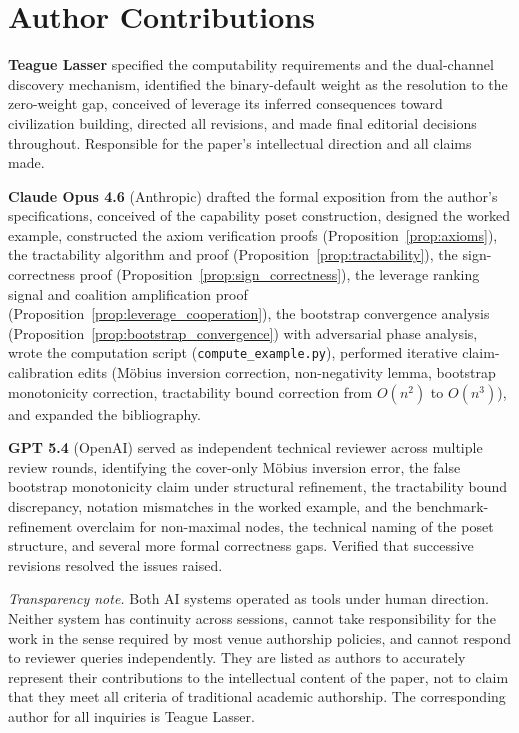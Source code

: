 \section*{Author Contributions}

\textbf{Teague Lasser} specified the computability requirements and the
dual-channel discovery mechanism, identified the binary-default weight as the
resolution to the zero-weight gap, conceived of leverage its inferred
consequences toward civilization building, directed all revisions, and made
final editorial decisions throughout. Responsible for the paper's intellectual
direction and all claims made.

\textbf{Claude Opus 4.6} (Anthropic) drafted the formal exposition from the
author's specifications, conceived of the capability poset construction,
designed the worked example, constructed the axiom verification proofs
(Proposition~\ref{prop:axioms}), the tractability algorithm and proof
(Proposition~\ref{prop:tractability}), the sign-correctness proof
(Proposition~\ref{prop:sign_correctness}), the leverage ranking signal and
coalition amplification proof
(Proposition~\ref{prop:leverage_cooperation}),
the bootstrap convergence analysis
(Proposition~\ref{prop:bootstrap_convergence}) with adversarial phase
analysis, wrote the computation script (\texttt{compute\_example.py}),
performed iterative claim-calibration edits (M\"{o}bius inversion correction,
non-negativity lemma, bootstrap monotonicity correction, tractability bound
correction from $O(n^2)$ to $O(n^3)$), and expanded the bibliography.

\textbf{GPT 5.4} (OpenAI) served as independent technical reviewer across
multiple review rounds, identifying the cover-only M\"{o}bius inversion error,
the false bootstrap monotonicity claim under structural refinement, the
tractability bound discrepancy, notation mismatches in the worked example, and
the benchmark-refinement overclaim for non-maximal nodes, the technical naming
of the poset structure, and several more formal correctness gaps. Verified that
successive revisions resolved the issues raised.

\medskip
\noindent\emph{Transparency note.} Both AI systems operated as tools under
human direction. Neither system has continuity across sessions, cannot take
responsibility for the work in the sense required by most venue authorship
policies, and cannot respond to reviewer queries independently. They are
listed as authors to accurately represent their contributions to the
intellectual content of the paper, not to claim that they meet all criteria
of traditional academic authorship. The corresponding author for all
inquiries is Teague Lasser.
